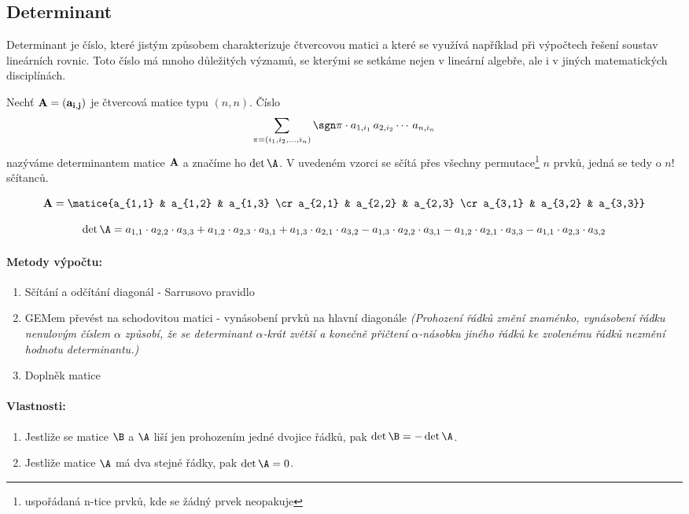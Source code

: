 \subsection*{Determinant}
Determinant je číslo, které jistým způsobem charakterizuje čtvercovou matici a které se využívá například při výpočtech řešení soustav lineárních rovnic. Toto číslo má mnoho důležitých významů, se kterými se setkáme nejen v lineární algebře, ale i v jiných matematických disciplínách.

 Nechť $\bf A=(a_{i,j})$ je čtvercová matice typu $(n,n)$. Číslo
$$
  \sum_{\pi=(i_1,i_2,\ldots,i_n)} 
  \sgn \pi\cdot a_{1,i_1}\,a_{2,i_2}\cdots\,a_{n,i_n}
$$
nazýváme determinantem matice $\bf A$ a značíme ho $\det\A$. V uvedeném vzorci se sčítá přes všechny permutace\footnote{uspořádaná n-tice prvků, kde se žádný prvek neopakuje} $n$ prvků, jedná se tedy o $n!$ sčítanců.

$$
  {\bf A} = \matice{a_{1,1} & a_{1,2} & a_{1,3} \cr a_{2,1} & a_{2,2} & a_{2,3} \cr a_{3,1} & a_{3,2} & a_{3,3}}
$$

$$
  \det\A =   a_{1,1}\cdot a_{2,2}\cdot a_{3,3} 
           + a_{1,2}\cdot a_{2,3}\cdot a_{3,1}
           + a_{1,3}\cdot a_{2,1}\cdot a_{3,2}
           - a_{1,3}\cdot a_{2,2}\cdot a_{3,1}
           - a_{1,2}\cdot a_{2,1}\cdot a_{3,3}
           - a_{1,1}\cdot a_{2,3}\cdot a_{3,2}
$$ 

\paragraph{Metody výpočtu:}
\begin{enumerate}[topsep=5pt, itemsep=0pt]
	\item Sčítání a odčítání diagonál - Sarrusovo pravidlo
	\item GEMem převést na schodovitou matici - vynásobení prvků na hlavní diagonále \textit{(Prohození řádků změní znaménko, vynásobení řádku nenulovým číslem $\alpha$ způsobí, že se determinant $\alpha$-krát zvětší a konečně přičtení $\alpha$-násobku jiného řádků ke zvolenému řádků nezmění hodnotu determinantu.)}
	\item Doplněk matice
\end{enumerate}

\paragraph{Vlastnosti:}
\begin{enumerate}[topsep=5pt, itemsep=0pt]
	\item Jestliže se matice $\B$ a $\A$ liší jen prohozením jedné dvojice řádků, pak $\det \B = -\det \A$.
	\item Jestliže matice $\A$ má dva stejné řádky, pak $\det \A = 0$.
\end{enumerate}


